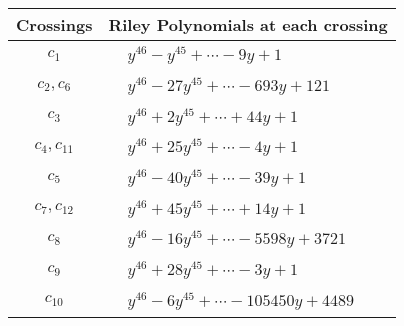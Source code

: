 \documentclass[1p]{elsarticle_modified}
\theoremstyle{definition}
\begin{document}
\begin{tabular}{m{50pt}|m{274pt}}
Crossings & \hspace{64pt}Riley Polynomials at each crossing \\
\hline $$\begin{aligned}c_{1}\end{aligned}$$&$\begin{aligned}
&y^{46}- y^{45}+\cdots-9 y+1
\end{aligned}$\\
\hline $$\begin{aligned}c_{2},c_{6}\end{aligned}$$&$\begin{aligned}
&y^{46}-27 y^{45}+\cdots-693 y+121
\end{aligned}$\\
\hline $$\begin{aligned}c_{3}\end{aligned}$$&$\begin{aligned}
&y^{46}+2 y^{45}+\cdots+44 y+1
\end{aligned}$\\
\hline $$\begin{aligned}c_{4},c_{11}\end{aligned}$$&$\begin{aligned}
&y^{46}+25 y^{45}+\cdots-4 y+1
\end{aligned}$\\
\hline $$\begin{aligned}c_{5}\end{aligned}$$&$\begin{aligned}
&y^{46}-40 y^{45}+\cdots-39 y+1
\end{aligned}$\\
\hline $$\begin{aligned}c_{7},c_{12}\end{aligned}$$&$\begin{aligned}
&y^{46}+45 y^{45}+\cdots+14 y+1
\end{aligned}$\\
\hline $$\begin{aligned}c_{8}\end{aligned}$$&$\begin{aligned}
&y^{46}-16 y^{45}+\cdots-5598 y+3721
\end{aligned}$\\
\hline $$\begin{aligned}c_{9}\end{aligned}$$&$\begin{aligned}
&y^{46}+28 y^{45}+\cdots-3 y+1
\end{aligned}$\\
\hline $$\begin{aligned}c_{10}\end{aligned}$$&$\begin{aligned}
&y^{46}-6 y^{45}+\cdots-105450 y+4489
\end{aligned}$\\
\hline
\end{tabular}\\~\\
\end{document}
